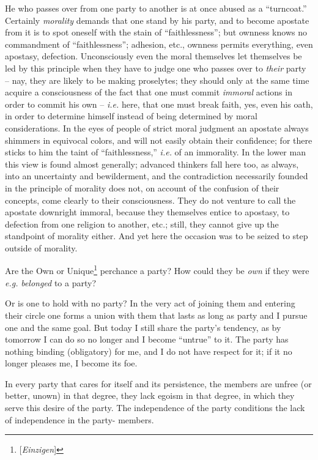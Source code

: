 He who passes over from one party to another is at once abused as a 
``turncoat.'' Certainly \textit{morality} demands that one stand by his 
party, and to become apostate from it is to spot oneself with the stain of 
``faithlessness''; but ownness knows no commandment of ``faithlessness''; 
adhesion, etc., ownness permits everything, even apostasy, defection. 
Unconsciously even the moral themselves let themselves be led by this 
principle when they have to judge one who passes over to \textit{their} party  -- nay, they are likely to be making proselytes; they should only at the same 
time acquire a consciousness of the fact that one must commit \textit{immoral} 
actions in order to commit his own -- \textit{i.e.} here, that one must break 
faith, yes, even his oath, in order to determine himself instead of being 
determined by moral considerations. In the eyes of people of strict moral 
judgment an apostate always shimmers in equivocal colors, and will not easily 
obtain their confidence; for there sticks to him the taint of 
``faithlessness,'' \textit{i.e.} of an immorality. In the lower man this 
view is found almost generally; advanced thinkers fall here too, as always, 
into an uncertainty and bewilderment, and the contradiction necessarily 
founded in the principle of morality does not, on account of the confusion of 
their concepts, come clearly to their consciousness. They do not venture to 
call the apostate downright immoral, because they themselves entice to 
apostasy, to defection from one religion to another, etc.; still, they cannot 
give up the standpoint of morality either. And yet here the occasion was to be 
seized to step outside of morality.

Are the Own or Unique\footnote{[\textit{Einzigen}]} perchance a party? How 
could they be \textit{own} if they were \textit{e.g.} \textit{belonged} to a 
party?

Or is one to hold with no party? In the very act of joining them and entering 
their circle one forms a union with them that lasts as long as party and I 
pursue one and the same goal. But today I still share the party's tendency, as 
by tomorrow I can do so no longer and I become ``untrue'' to it. The party 
has nothing binding (obligatory) for me, and I do not have respect for it; if 
it no longer pleases me, I become its foe.

In every party that cares for itself and its persistence, the members are 
unfree (or better, unown) in that degree, they lack egoism in that degree, in 
which they serve this desire of the party. The independence of the party 
conditions the lack of independence in the party- members.

